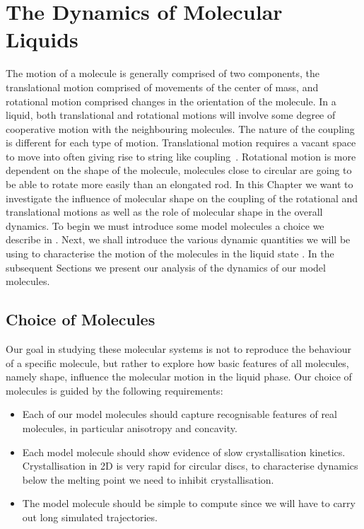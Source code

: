 \chapter{The Dynamics of Molecular Liquids}
\label{sec:dynamics}

The motion of a molecule is generally comprised of two components, the translational motion comprised of movements of the center of mass, and rotational motion comprised changes in the orientation of the molecule. In a liquid, both translational and rotational motions will involve some degree of cooperative motion with the neighbouring molecules. The nature of the coupling is different for each type of motion. Translational motion requires a vacant space to move into often giving rise to string like coupling~\tocite. Rotational motion is more dependent on the shape of the molecule, molecules close to circular are going to be able to rotate more easily than an elongated rod. In this Chapter we want to investigate the influence of molecular shape on the coupling of the rotational and translational motions as well as the role of molecular shape in the overall dynamics. To begin we must introduce some model molecules a choice we describe in . Next, we shall introduce the various dynamic quantities we will be using to characterise the motion of the molecules in the liquid state . In the subsequent Sections we present our analysis of the dynamics of our model molecules.


\section{Choice of Molecules}
\label{sec:mol choice}

Our goal in studying these molecular systems is not to reproduce the behaviour of a specific molecule, but rather to explore how basic features of all molecules, namely shape, influence the molecular motion in the liquid phase. Our choice of molecules is guided by the following requirements:
\begin{itemize}
    \item Each of our model molecules should capture recognisable features of real molecules, in particular anisotropy and concavity.
    \item Each model molecule should show evidence of slow crystallisation kinetics. Crystallisation in 2D is very rapid for circular discs, to characterise dynamics below the melting point we need to inhibit crystallisation.
    \item The model molecule should be simple to compute since we will have to carry out long simulated trajectories.
\end{itemize}

